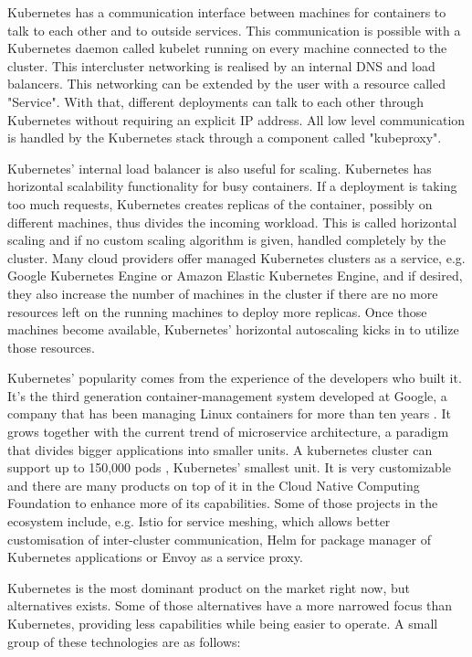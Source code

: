 Kubernetes has a communication interface between machines for containers to talk to each other and to outside services. This communication is possible with a Kubernetes daemon called kubelet running on every machine connected to the cluster. This intercluster networking is realised by an internal DNS and load balancers. This networking can be extended by the user with a resource called "Service". With that, different deployments can talk to each other through Kubernetes without requiring an explicit IP address. All low level communication is handled by the Kubernetes stack through a component called "kubeproxy".

Kubernetes' internal load balancer is also useful for scaling. Kubernetes has horizontal scalability functionality for busy containers. If a deployment is taking too much requests, Kubernetes creates replicas of the container, possibly on different machines, thus divides the incoming workload. This is called horizontal scaling and if no custom scaling algorithm is given, handled completely by the cluster. Many cloud providers offer managed Kubernetes clusters as a service, e.g. Google Kubernetes Engine or Amazon Elastic Kubernetes Engine, and if desired, they also increase the number of machines in the cluster if there are no more resources left on the running machines to deploy more replicas. Once those machines become available, Kubernetes' horizontal autoscaling kicks in to utilize those resources.

Kubernetes' popularity comes from the experience of the developers who built it. It's the third generation container-management system developed at Google, a company that has been managing Linux containers for more than ten years \cite{acm-borg}. It grows together with the current trend of microservice architecture, a paradigm that divides bigger applications into smaller units. A kubernetes cluster can support up to 150,000 pods \cite{kubernetes-load}, Kubernetes' smallest unit. It is very customizable and there are many products on top of it in the Cloud Native Computing Foundation to enhance more of its capabilities. Some of those projects in the ecosystem include, e.g. Istio for service meshing, which allows better customisation of inter-cluster communication, Helm for package manager of Kubernetes applications or Envoy as a service proxy.

Kubernetes is the most dominant product on the market right now, but alternatives exists. Some of those alternatives have a more narrowed focus than Kubernetes, providing less capabilities while being easier to operate. A small group of these technologies are as follows:

